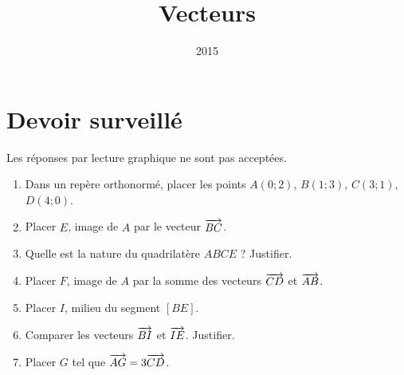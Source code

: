 \documentclass[14pt, aspectratio=43]{beamer}
\institute{Lycée Marie Curie}
\date{2015}
\title{Vecteurs}
\begin{document}
\section{Devoir surveillé}
\begin{frame}
\end{frame}

\begin{frame}
  \begin{em}
    Les réponses par lecture graphique ne sont pas acceptées.
  \end{em}
  \begin{enumerate}
    \item Dans un repère orthonormé, placer les points $A\left( 0;2 \right)$, $B\left( 1;3 \right)$, $C\left( 3;1 \right)$, $D\left( 4;0 \right)$.
    \item Placer $E$, image de $A$ par le vecteur $\overrightarrow{BC}$.
    \item Quelle est la nature du quadrilatère $ABCE$ ? Justifier.
    \item Placer $F$, image de $A$ par la somme des vecteurs $\overrightarrow{CD}$ et $\overrightarrow{AB}$.
    \item Placer $I$, milieu du segment $\left[ BE \right]$.
    \item Comparer les vecteurs $\overrightarrow{BI}$ et $\overrightarrow{IE}$. Justifier.
  \item Placer $G$ tel que $\overrightarrow{AG}=3\overrightarrow{CD}$.
  \end{enumerate}
\end{frame}
\end{document}
